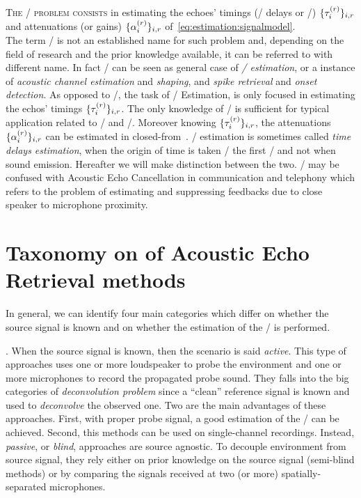 \mynewline
\textsc{The \AERdef/ problem consists} in estimating the echoes' timings (\aka/ delays or \TOAdef/) $\{\tau_{i}^{(r)}\}_{i,r}$ and attenuations (or gains) $\{\alpha_{i}^{(r)}\}_{i,r}$ of~\cref{eq:estimation:signalmodel}.
\\The term \AER/ is not an established name for such problem and, depending on the field of research and the prior knowledge available, it can be referred to with different name.
In fact \AER/ can be seen as general case of \textit{\TOAs/ estimation}, or a instance of \textit{acoustic channel estimation} and \textit{shaping}, and \textit{spike retrieval} and \textit{onset detection}.
As opposed to \AER/, the task of \TOAs/ Estimation, is only focused in estimating the echos' timings $\{\tau_{i}^{(r)}\}_{i,r}$.
The only knowledge of \TOAs/ is sufficient for typical application related to \SSL/ and \RooGE/.
Moreover knowing $\{\tau_{i}^{(r)}\}_{i,r}$, the attenuations $\{\alpha_{i}^{(r)}\}_{i,r}$ can be estimated in closed-from~.
\TOAs/ estimation is sometimes called \textit{time delays estimation}, when the origin of time is taken \wrt/ the first \TOA/ and not when sound emission.
Hereafter we will make distinction between the two.
\AER/ may be confused with Acoustic Echo Cancellation in communication and telephony which refers to the problem of estimating and suppressing feedbacks due to close speaker to microphone proximity.

\section{Taxonomy on of Acoustic Echo Retrieval methods}\label{sec:estimation:taxonomy}

In general, we can identify four main categories which differ on whether the source signal is known and on whether the estimation of the \RIR/ is performed.

.
When the source signal is known, then the scenario is said \textit{active}.
This type of approaches uses one or more loudspeaker to probe the environment and one or more microphones to record the propagated probe sound.
They falls into the big categories of \textit{deconvolution problem} since a ``clean'' reference signal is known and used to \textit{deconvolve} the observed one.
Two are the main advantages of these approaches.
First, with proper probe signal, a good estimation of the \RIR/ can be achieved.
Second, this methods can be used on single-channel recordings.
Instead, \textit{passive}, or \textit{blind}, approaches are source agnostic.
To decouple environment from source signal, they rely either on prior knowledge on the source signal (semi-blind methods) or by comparing the signals received at two (or more) spatially-separated microphones.

